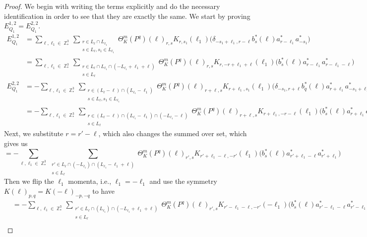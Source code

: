 \documentclass[sn-mathphys, Numbered ,a4paper]{sn-jnl}%
\DeclareMathOperator{\Z}{\mathbb{Z}}
\theoremstyle{plain}
\theoremstyle{definition}
\theoremstyle{remark}
\theoremstyle{plain}
\theoremstyle{definition}
\theoremstyle{remark}
\begin{document}
\begin{proof}
	We begin with writing the terms explicitly and do the necessary identification in order to see that they are exactly the same.
	We start by proving $E_{Q_1}^{1,2}=E_{Q_1}^{2,2}$.
	\begin{align}
		E_{Q_1}^{1,2} &={\sum\limits_{\ell, \ell_1\in \Z^3_*}\sum\limits_{\substack{r \in L_{\ell}\cap  L_{\ell_1}\\s \in L_{\ell}, s_1\in L_{\ell_1}}} \!\!\!\Theta^m_K(P^q)(\ell)_{r,s} K_{r,s_1}(\ell_1)\Big( \delta_{-s_1+\ell_1,r-\ell} b^*_{s}(\ell) a^*_{r-\ell_1} a^*_{-s_1} \Big)\nonumber}\\
		&=\sum\limits_{\ell, \ell_1\in \Z^3_*}\sum\limits_{\substack{r \in L_{\ell}\cap  L_{\ell_1} \cap (-L_{\ell_1}+\ell_1+\ell)\\s \in L_{\ell}}} \!\!\!\Theta^m_K(P^q)(\ell)_{r,s} K_{r,-r+\ell_1+\ell}(\ell_1) \Big( b^*_{s}(\ell) a^*_{r-\ell_1} a^*_{r-\ell_1-\ell} \Big)\label{eq:EQ112}\\
		E_{Q_1}^{2,2} &= -\sum\limits_{\ell, \ell_1\in \Z^3_*}\sum\limits_{\substack{r \in  (L_{\ell}-\ell)  \cap   (L_{\ell_1}-\ell_1) \\ s \in L_{\ell}, s_1 \in L_{\ell_1}}} \!\!\!\! \Theta^m_K(P^q)(\ell)_{r+\ell,s}
		K_{r+\ell_1,s_1}(\ell_1)\Big(\delta_{-s_1,r+\ell} b^*_{q}(\ell) a^*_{r+\ell_1}a^*_{-s_1+\ell_1}\Big) \nonumber\\
		&=-\sum\limits_{\ell, \ell_1\in \Z^3_*}\sum\limits_{\substack{r \in  (L_{\ell}-\ell) \cap (L_{\ell_1}-\ell_1) \cap   (-L_{\ell_1}-\ell) \\ s \in L_{\ell}}}\Theta^m_K(P^q)(\ell)_{r+\ell,s} 
		K_{r+\ell_1,-r-\ell}(\ell_1) \Big( b^*_{s}(\ell) a^*_{r+\ell_1} a^*_{r+\ell+\ell_1} \Big)  
	\end{align}
	Next, we substitute $r = r'-\ell $, which also changes the summed over set, which gives us
	\begin{equation}
		=-\sum\limits_{\ell, \ell_1\in \Z^3_*}\sum\limits_{\substack{r' \in  L_{\ell} \cap (-L_{\ell_1}) \cap  (L_{\ell_1}-\ell_1+\ell)\\ s \in L_{\ell}}} \!\!\!\! \Theta^m_K(P^q)(\ell)_{r',s}
		K_{r'+\ell_1-\ell,-r'}(\ell_1)\Big( b^*_{s}(\ell) a^*_{r'+\ell_1-\ell}a^*_{r'+\ell_1}\Big) 
	\end{equation}
	Then we flip the $\ell_1$ momenta, i.e., $\ell_1 = -\ell_1$ and use the symmetry $K(\ell)_{p,q} = K(-\ell)_{-p,-q}$ to have
	\begin{align}
		&=-\sum\limits_{\ell, \ell_1\in \Z^3_*}\sum\limits_{\substack{r' \in  L_{\ell} \cap (L_{\ell_1}) \cap  (-L_{\ell_1}+\ell_1+\ell)\\ s \in L_{\ell}}}  \Theta^m_K(P^q)(\ell)_{r',s} K_{r'-\ell_1-\ell,-r'}(-\ell_1)\Big( b^*_{s}(\ell) a^*_{r'-\ell_1-\ell}a^*_{r'-\ell_1}\Big)\nonumber\\

\end{align}
\end{proof}
\end{document}

